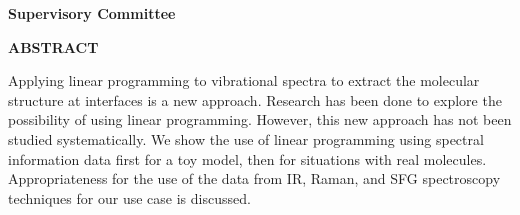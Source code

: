 \newpage
{}

\noindent \textbf{Supervisory Committee}
\tpbreak
\panel

\begin{center}
\textbf{ABSTRACT}
\end{center}

Applying linear programming to vibrational spectra to extract the molecular structure at interfaces is a new approach. Research has been done to explore the possibility of using linear programming. However, this new approach has not been studied systematically. We show the use of linear programming using spectral information data first for a toy model, then for situations with real molecules. Appropriateness for the use of the data from IR, Raman, and SFG spectroscopy techniques for our use case is discussed.
